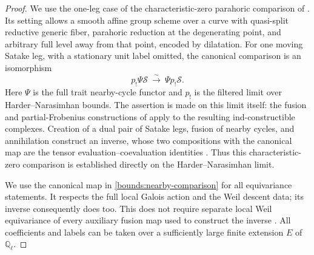 \documentclass[11pt]{article}
\numberwithin{equation}{section}
\theoremstyle{definition}
\theoremstyle{remark}
\newcommand{\Q}{\mathbb Q}
\begin{document}
\begin{proof}
We use the one-leg case of the characteristic-zero parahoric
comparison of \cite[Theorem~5.2(1)]{Bounds:SalmonNearby}.  Its setting
allows a smooth affine group scheme over a curve with quasi-split
reductive generic fiber, parahoric reduction at the degenerating point,
and arbitrary full level away from that point, encoded by dilatation.
For one moving Satake leg, with a stationary unit label omitted, the
canonical comparison is an isomorphism
\begin{equation}
 p_!\Psi\mathcal S\ \xrightarrow{\ \sim\ }\ \Psi p_!\mathcal S.
 \label{bounds:nearby-comparison}
\end{equation}
Here $\Psi$ is the full trait nearby-cycle functor and $p_!$ is the
filtered limit over Harder--Narasimhan bounds.  The assertion is made
on this limit itself: the fusion and partial-Frobenius constructions
of \cite[Proposition~3.5, Theorem~3.8, and Lemma~4.2]{Bounds:SalmonNearby}
apply to the resulting ind-constructible complexes.  Creation of a
dual pair of Satake legs, fusion of nearby cycles, and annihilation
construct an inverse, whose two compositions with the canonical map
are the tensor evaluation--coevaluation identities
\cite[Lemma~4.6, Corollary~4.7, and proof of Theorem~5.2]{Bounds:SalmonNearby}.
Thus this characteristic-zero comparison is established directly on
the Harder--Narasimhan limit.

We use the canonical map in \eqref{bounds:nearby-comparison} for all
equivariance statements.  It respects the full local Galois action
and the Weil descent data; its inverse consequently does too.  This
does not require separate local Weil equivariance of every auxiliary
fusion map used to construct the inverse
\cite[paragraph following Lemma~4.6 and Corollary~6.1]{Bounds:SalmonNearby}.
All coefficients and labels can be taken over a sufficiently large
finite extension $E$ of $\Q_\ell$.


\end{proof}
\end{document}
